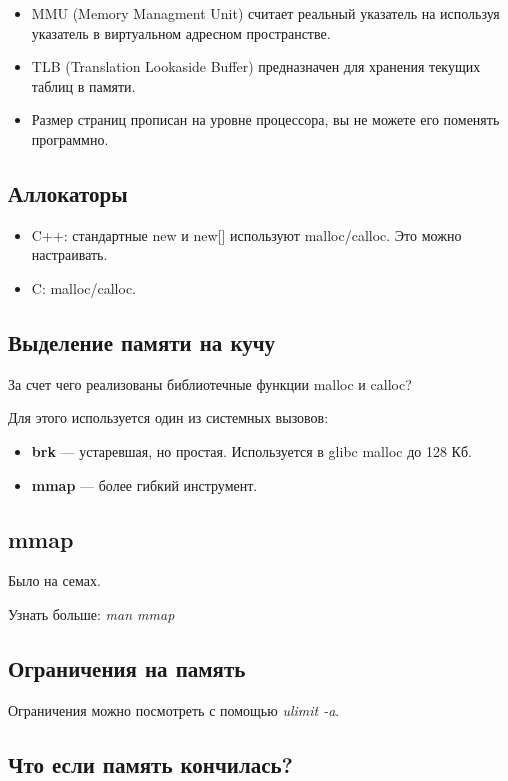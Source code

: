\begin{itemize}
	\item MMU (Memory Managment Unit) считает реальный указатель на используя указатель
	в виртуальном адресном пространстве.
	\item TLB (Translation Lookaside Buffer) предназначен для хранения текущих 
	таблиц в памяти.
	\item Размер страниц прописан на уровне процессора, вы не можете его поменять программно.
\end{itemize}

\subsection{Аллокаторы}

\begin{itemize}
	\item C++: стандартные new и new[] используют malloc/calloc. Это можно настраивать.
	\item C: malloc/calloc.
\end{itemize}

\subsection{Выделение памяти на кучу}

За счет чего реализованы библиотечные функции malloc и calloc?

Для этого используется один из системных вызовов:
\begin{itemize}
	\item \textbf{brk} --- устаревшая, но простая. Используется в glibc malloc до 128 Кб.
	\item \textbf{mmap} --- более гибкий инструмент.
\end{itemize}

\subsection{mmap}

Было на семах. 

Узнать больше: \textit{man mmap}

\subsection{Ограничения на память}

Ограничения можно посмотреть с помощью \textit{ulimit -a}.

\subsection{Что если память кончилась?}

